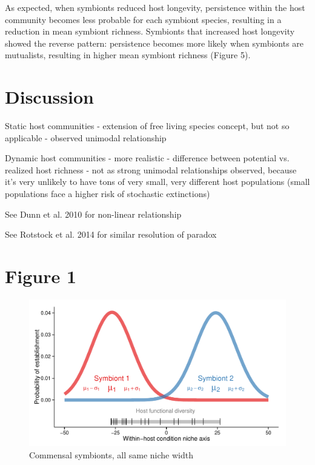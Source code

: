 \documentclass[12pt]{article}
\begin{document}
As expected, when symbionts reduced host longevity, persistence within the host community becomes less probable for each symbiont species, resulting in a reduction in mean symbiont richness. 
Symbionts that increased host longevity showed the reverse pattern: persistence becomes more likely when symbionts are mutualists, resulting in higher mean symbiont richness (Figure 5). 

\section{Discussion}

Static host communities 
- extension of free living species concept, but not so applicable
- observed unimodal relationship

Dynamic host communities
- more realistic
- difference between potential vs. realized host richness
- not as strong unimodal relationships observed, because it's very unlikely to have tons of very small, very different host populations (small populations face a higher risk of stochastic extinctions)

See Dunn et al. 2010 for non-linear relationship

See Rotstock et al. 2014 for similar resolution of paradox




\newpage

\section*{Figure 1}

\begin{figure}[ht]\centering
\includegraphics[width=\linewidth]{fig/niche.pdf}
\caption{Commensal symbionts, all same niche width}
\label{fig:fig/fig1}
\end{figure}
\end{document}
